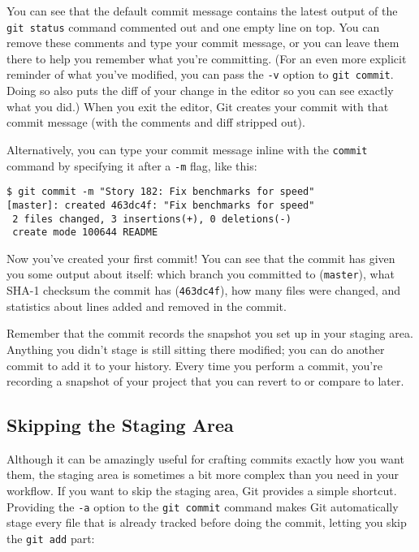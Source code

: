 \documentclass[a4paper]{book}
\begin{document}
You can see that the default commit message contains the latest output of the \texttt{git status} command commented out and one empty line on top. You can remove these comments and type your commit message, or you can leave them there to help you remember what you're committing. (For an even more explicit reminder of what you've modified, you can pass the \texttt{-v} option to \texttt{git commit}. Doing so also puts the diff of your change in the editor so you can see exactly what you did.) When you exit the editor, Git creates your commit with that commit message (with the comments and diff stripped out).

Alternatively, you can type your commit message inline with the \texttt{commit} command by specifying it after a \texttt{-m} flag, like this:

\begin{shaded}\begin{verbatim}
$ git commit -m "Story 182: Fix benchmarks for speed"
[master]: created 463dc4f: "Fix benchmarks for speed"
 2 files changed, 3 insertions(+), 0 deletions(-)
 create mode 100644 README
\end{verbatim}\end{shaded}

Now you've created your first commit! You can see that the commit has given you some output about itself: which branch you committed to (\texttt{master}), what SHA-1 checksum the commit has (\texttt{463dc4f}), how many files were changed, and statistics about lines added and removed in the commit.

Remember that the commit records the snapshot you set up in your staging area. Anything you didn't stage is still sitting there modified; you can do another commit to add it to your history. Every time you perform a commit, you're recording a snapshot of your project that you can revert to or compare to later.

\subsection{Skipping the Staging Area}

Although it can be amazingly useful for crafting commits exactly how you want them, the staging area is sometimes a bit more complex than you need in your workflow. If you want to skip the staging area, Git provides a simple shortcut. Providing the \texttt{-a} option to the \texttt{git commit} command makes Git automatically stage every file that is already tracked before doing the commit, letting you skip the \texttt{git add} part:
\end{document}
